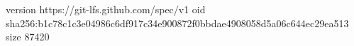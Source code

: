 version https://git-lfs.github.com/spec/v1
oid sha256:b1c78c1c3e04986c6df917c34e900872f0bbdae4908058d5a06c644ec29ea513
size 87420
